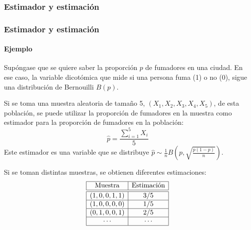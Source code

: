 \begin{frame}
\frametitle{Estimador y estimación}
\begin{center}

\end{center}
\end{frame}


\begin{frame}
\frametitle{Estimador y estimación}
\framesubtitle{Ejemplo}
Supóngase que se quiere saber la proporción $p$ de fumadores en una ciudad.
En ese caso, la variable dicotómica que mide si una persona fuma (1) o no (0), sigue una distribución de Bernouilli $B(p)$.

Si se toma una muestra aleatoria de tamaño 5, $(X_1,X_2,X_3,X_4,X_5)$, de esta población, se puede utilizar la proporción de fumadores en la muestra como estimador para la proporción de fumadores en la población:
\[
\hat p = \frac{\sum_{i=1}^5 X_i}{5}
\]
Este estimador es una variable que se distribuye
$\hat p\sim \frac{1}{n}B\left(p,\sqrt{\frac{p(1-p)}{n}}\right)$.

Si se toman distintas muestras, se obtienen diferentes estimaciones:
\[
\begin{array}{|c|c|}
\hline
\mbox{Muestra} & \mbox{Estimación}\\
\hline\hline
(1, 0, 0, 1, 1) & 3/5\\
\hline
(1, 0, 0, 0, 0) & 1/5\\
\hline
(0, 1, 0, 0, 1) & 2/5\\
\hline
\cdots & \cdots\\
\hline
\end{array}
\]
\end{frame}


